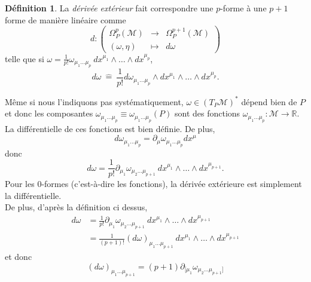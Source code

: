 \documentclass[a4paper,11pt]{report}
\theoremstyle{definition}
\theoremstyle{plain}
\theoremstyle{definition}
\newtheorem{defn}{Définition}[chapter]
\theoremstyle{remark}
\newcommand{\M}{\mathscr{M}}
\newcommand{\p}{\partial}
\begin{document}
            \begin{defn}
                La \textit{dérivée extérieur} fait correspondre une $p$-forme à une $p+1$ forme de manière linéaire comme
                \begin{equation}
                d:\left(
                \begin{array}{ccc}
                    \Omega_P^p(\M) & \longrightarrow & \Omega_P^{p+1}(\M) \\
                    (\omega,\eta) & \longmapsto & d\omega
                \end{array}
                \right)
                \end{equation}
                telle que si $\omega = \frac{1}{p!}\omega_{\mu_1\dots\mu_p}~dx^{\mu_1}\wedge \dots\wedge dx^{\mu_p}$,
                \begin{equation}
                    d\omega ~\hat{=}~ \frac{1}{p!} d\omega_{\mu_1\dots\mu_p}\wedge dx^{\mu_1}\wedge \dots\wedge dx^{\mu_p}.
                \end{equation}
            \end{defn}
            
            Même si nous l'indiquons pas systématiquement, $\omega\in (T_P\M)^*$ dépend bien de $P$ et donc les composantes $\omega_{\mu_1\dots\mu_p}\equiv \omega_{\mu_1\dots\mu_p}(P)$ sont des fonctions $\omega_{\mu_1\dots\mu_p}:\M\to\mathbb{R}$. La différentielle de ces fonctions est bien définie. De plus, 
            \begin{equation}
                d\omega_{\mu_1\dots\mu_p} = \p_\mu \omega_{\mu_1\dots\mu_p}dx^\mu
            \end{equation}
            donc
            \begin{equation}
                d\omega = \frac{1}{p!} \p_{\mu_1}\omega_{\mu_2\dots\mu_{p+1}}~dx^{\mu_1}\wedge \dots\wedge dx^{\mu_{p+1}}.
            \end{equation}
            Pour les $0$-formes (c'est-à-dire les fonctions), la dérivée extérieure est simplement la différentielle.\\
            
            De plus, d'après la définition ci dessus,
            \begin{align}
                d\omega &= \frac{1}{p!} \p_{\mu_1}\omega_{\mu_2\dots\mu_{p+1}}~dx^{\mu_1}\wedge \dots\wedge dx^{\mu_{p+1}}\\
                &= \frac{1}{(p+1)!}(d\omega)_{\mu_1 \dots\mu_{p+1}}~dx^{\mu_1}\wedge \dots\wedge dx^{\mu_{p+1}}
            \end{align}
            et donc
            \begin{equation}
                (d\omega)_{\mu_1 \dots\mu_{p+1}} = (p+1) \p_{[\mu_1}\omega_{\mu_2\dots\mu_{p+1}]}
            \end{equation}
            
\end{document}
